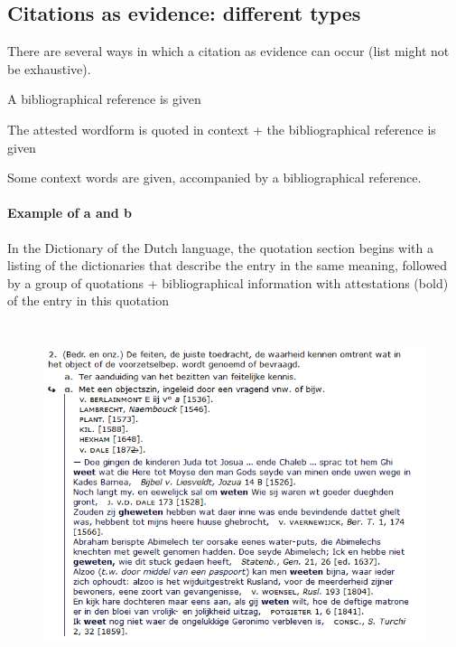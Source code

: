 \documentclass[10pt]{article}
\let\tempeone\enumerate
\let\tempetwo\endenumerate
\renewenvironment{enumerate}{\tempeone\setlength\itemsep{-0.5pt}\setlength{\partopsep}{-0.5pt}\setlength{\parsep}{-0.5pt}\setlength{\topsep}{-0.5pt}}{\tempetwo}
\begin{document}
\subsection{Citations as evidence: different types}


 There are several ways in which a citation as evidence can occur (list might not be exhaustive).\par



\begin{enumerate}
	\item  A bibliographical reference is given

	\item The attested wordform is quoted in context + the bibliographical reference is given

	\item Some context words are given, accompanied by a bibliographical reference.
\end{enumerate}



\paragraph*{Example of a and b}

 In the Dictionary of the Dutch language, the quotation section begins with a listing of the dictionaries that describe the entry in the same meaning, followed by a group of quotations + bibliographical information with attestations (bold) of the entry in this quotation\par



\begin{figure}[H]
	\begin{Center}
		\includegraphics[width=5.14in,height=3.93in]{./image19.png}
	\end{Center}
\end{figure}
\end{document}
